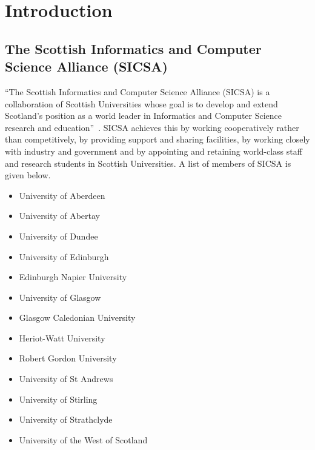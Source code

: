 


\chapter{Introduction}

\section{The Scottish Informatics and Computer Science Alliance (SICSA)}

``The Scottish Informatics and Computer Science Alliance (SICSA) is a collaboration of Scottish Universities whose goal is to develop 
and extend Scotland's position as a world leader in Informatics and Computer Science research and education''~\cite{sicsa}. 
SICSA achieves this by working cooperatively rather than competitively, by providing support and sharing facilities, by working closely 
with industry and government and by appointing and retaining world-class staff and research students in Scottish Universities.
A list of members of SICSA is given below.

\begin{itemize}
 \item University of Aberdeen
 \item University of Abertay
 \item University of Dundee
 \item University of Edinburgh
 \item Edinburgh Napier University
 \item University of Glasgow
 \item Glasgow Caledonian University
 \item Heriot-Watt University
 \item Robert Gordon University
 \item University of St Andrews
 \item University of Stirling
 \item University of Strathclyde
 \item University of the West of Scotland
\end{itemize}

